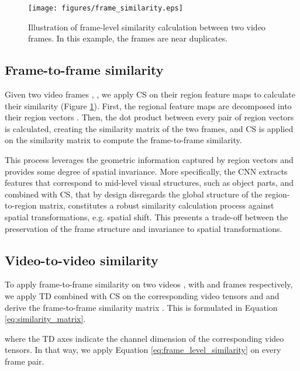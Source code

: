 \documentclass[10pt,twocolumn,letterpaper]{article}
\begin{document}
\begin{figure}[t]
\centering
\texttt{[image: figures/frame\_similarity.eps]}
\caption{Illustration of frame-level similarity calculation between two video frames. In this example, the frames are near duplicates.}
\label{fig:frame_level_similarity}
\end{figure}

\subsection{Frame-to-frame similarity}
\label{sec:frame_level_similarity}

Given two video frames , , we apply CS on their region feature maps to calculate their similarity (Figure \ref{fig:frame_level_similarity}). First, the regional feature maps  are decomposed into their region vectors . Then, the dot product between every pair of region vectors is calculated, creating the similarity matrix of the two frames, and CS is applied on the similarity matrix to compute the frame-to-frame similarity.

This process leverages the geometric information captured by region vectors and provides some degree of spatial invariance. More specifically, the CNN extracts features that correspond to mid-level visual structures, such as object parts, and combined with CS, that by design disregards the global structure of the region-to-region matrix, constitutes a robust similarity calculation process against spatial transformations, e.g. spatial shift. This presents a trade-off between the preservation of the frame structure and invariance to spatial transformations.



\subsection{Video-to-video similarity}
\label{sec:video_level_similarity}

To apply frame-to-frame similarity on two videos ,  with  and  frames respectively,  we apply TD combined with CS on the corresponding video tensors  and  and derive the frame-to-frame similarity matrix . This is formulated in Equation \ref{eq:similarity_matrix}.

where the TD axes indicate the channel dimension of the corresponding video tensors. In that way, we apply Equation \ref{eq:frame_level_similarity} on every frame pair. 
\end{document}
